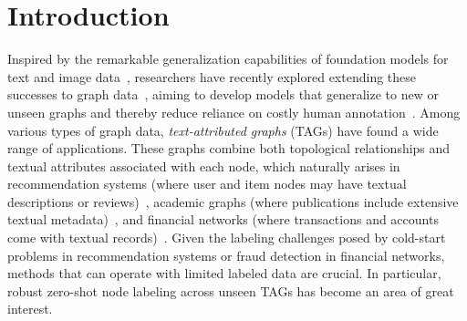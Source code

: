 \section{Introduction} \label{sec:intro}

Inspired by the remarkable generalization capabilities of foundation models for text and image data~\cite{achiam2023gpt, liu2021swin, radford2021learning}, researchers have recently explored extending these successes to graph data~\cite{liu2023towards, mao2024graph, zhao2023gimlet, fan2024graph, he2023harnessing}, aiming to develop models that generalize to new or unseen graphs and thereby reduce reliance on costly human annotation~\cite{li2024glbench, chen2024text, feng2024taglas, li2024teg}. Among various types of graph data, \emph{text-attributed graphs} (TAGs) have found a wide range of applications. These graphs combine both topological relationships and textual attributes associated with each node, which naturally arises in recommendation systems (where user and item nodes may have textual descriptions or reviews)~\cite{bobadilla2013recommender}, academic graphs (where publications include extensive textual metadata)~\cite{mccallum2000automating, giles1998citeseer}, and financial networks (where transactions and accounts come with textual records)~\cite{kumar2016edge, kumar2018rev2}. Given the labeling challenges posed by cold-start problems in recommendation systems or fraud detection in financial networks, methods that can operate with limited labeled data are crucial. In particular, robust zero-shot node labeling across unseen TAGs has become an area of great interest.

